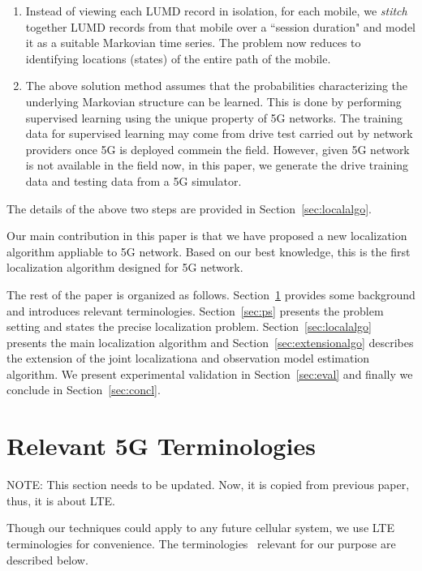 \documentclass[conference, 10pt]{IEEEtran}
\begin{document}
\begin{enumerate}
\item Instead of viewing each LUMD record in isolation, for each mobile, we {\em stitch}
together LUMD records from that mobile over a ``session
duration"  and model it as a suitable Markovian time series. The problem now
reduces to identifying locations (states) of the entire path of
the mobile.

\item The above solution method assumes that the probabilities characterizing the
underlying Markovian structure can be learned. This is done by performing supervised learning using the unique property of 5G networks.
The training data for supervised learning may come from
drive test carried out by network providers once 5G is deployed commein the field. However, given 5G network is not available in the field now, 
in this paper, we generate the drive training data and testing data from a 5G simulator.
	
\end{enumerate}

The details of the above two steps are provided in Section~\ref{sec:localalgo}.


Our main contribution in this paper is that we have proposed a new localization algorithm
appliable to 5G network. Based on our best knowledge, this is the first localization algorithm designed for 5G network. 


The rest of the paper is organized as follows. Section~\ref{sec:bg} provides some
background and introduces relevant terminologies. Section~\ref{sec:ps} presents
the problem setting and states the precise localization problem.
Section~\ref{sec:localalgo}
presents the main localization algorithm and Section~\ref{sec:extensionalgo} describes the extension of the joint localizationa and observation model estimation algorithm. 
We present experimental validation in Section~\ref{sec:eval} and finally we conclude in
Section~\ref{sec:concl}.




\section{Relevant 5G Terminologies}
\label{sec:bg}
NOTE: This section needs to be updated. Now, it is copied from previous paper, thus, it is about LTE.

Though our techniques could apply to any future cellular system, we use LTE
terminologies for convenience. The terminologies~\cite{ltebook} relevant for our purpose are
described below.
\end{document}
